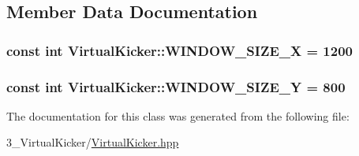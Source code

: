 \subsection{Member Data Documentation}
\subsubsection[{\texorpdfstring{W\+I\+N\+D\+O\+W\+\_\+\+S\+I\+Z\+E\+\_\+X}{WINDOW_SIZE_X}}]{\setlength{\rightskip}{0pt plus 5cm}const int Virtual\+Kicker\+::\+W\+I\+N\+D\+O\+W\+\_\+\+S\+I\+Z\+E\+\_\+X = 1200\hspace{0.3cm}{\ttfamily [static]}}\hypertarget{class_virtual_kicker_ab00ead9976b5ea4269238403772a0205}{}\label{class_virtual_kicker_ab00ead9976b5ea4269238403772a0205}
\subsubsection[{\texorpdfstring{W\+I\+N\+D\+O\+W\+\_\+\+S\+I\+Z\+E\+\_\+Y}{WINDOW_SIZE_Y}}]{\setlength{\rightskip}{0pt plus 5cm}const int Virtual\+Kicker\+::\+W\+I\+N\+D\+O\+W\+\_\+\+S\+I\+Z\+E\+\_\+Y = 800\hspace{0.3cm}{\ttfamily [static]}}\hypertarget{class_virtual_kicker_a3fb0d845e01a7424ac7a37f4299875ad}{}\label{class_virtual_kicker_a3fb0d845e01a7424ac7a37f4299875ad}


The documentation for this class was generated from the following file\+:\begin{DoxyCompactItemize}
\item 
3\+\_\+\+Virtual\+Kicker/\hyperlink{_virtual_kicker_8hpp}{Virtual\+Kicker.\+hpp}\end{DoxyCompactItemize}
